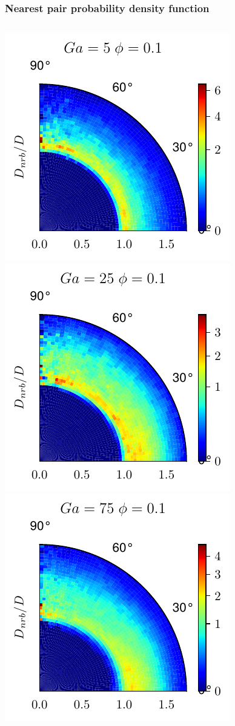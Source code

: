 \documentclass{sintefbeamer}
\begin{document}
\begin{frame}
  \frametitle{Nearest pair probability density function}

  \begin{columns}
    \centering
    
    \begin{flushright}
      \includegraphics[height=0.3\textwidth]{image/HOMOGENEOUS/fDrop/Pnst_mu_r_0_1_Ga_5_PHI_0_1.pdf}
      \includegraphics[height=0.3\textwidth]{image/HOMOGENEOUS/fDrop/Pnst_mu_r_0_1_Ga_25_PHI_0_1.pdf}
      \includegraphics[height=0.3\textwidth]{image/HOMOGENEOUS/fDrop/Pnst_mu_r_0_1_Ga_75_PHI_0_1.pdf}
      

\end{flushright}
\end{columns}
\end{frame}
\end{document}
